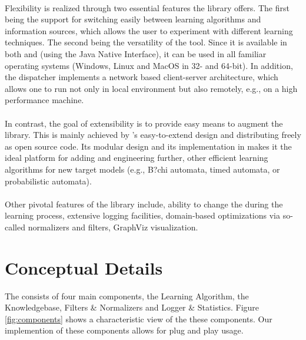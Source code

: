	  \paragraph{}	
		Flexibility is realized through two essential features the library offers. The first being the support for switching easily between learning algorithms and information sources, which allows the user to experiment with different learning techniques. The second being the versatility of the tool. Since it is available in both \cpp and \java (using the Java Native Interface), it can be used in all familiar operating systems (Windows, Linux and MacOS in 32- and 64-bit). In addition, the dispatcher implements a network based client-server architecture, which allows one to run \libalf not only in local environment but also remotely, e.g., on a high performance machine.
		\paragraph{}
		In contrast, the goal of extensibility is to provide easy means to augment the library. This is mainly achieved by \libalf's easy-to-extend design and distributing \libalf freely as open source code. Its modular design and its implementation in \cpp makes it the ideal platform for adding and engineering further, other efficient learning algorithms for new target models (e.g., B?chi automata, timed automata, or probabilistic automata). 
		\paragraph{}
		Other pivotal features of the library include, ability to change the \alphsize during the learning process, extensive logging facilities, domain-based optimizations via so-called normalizers and filters, GraphViz visualization.
		
		
\section{Conceptual Details}

	The \libalf consists of four main components, the Learning Algorithm, the Knowledgebase, Filters \& Normalizers and Logger \& Statistics. Figure \ref{fig:components} shows a characteristic view of the these components. Our implemention of these components allows for plug and play usage.

